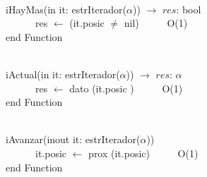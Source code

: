 \documentclass[a4paper,10pt]{article}
\begin{document}
\begin{algoritmo}
\caption{}\\
  iHayMas(in it: estrIterador($\alpha$)) $\rightarrow$ $res$: bool\\
	\indent \ \ \ \ \ \  res $\gets$ (it.posic $\neq$ nil)   \ \ \ \ \ O(1)\\
   end Function 
\end{algoritmo}

\begin{algoritmo}
\caption{}\\
  iActual(in it: estrIterador($\alpha$)) $\rightarrow$ $res$: $\alpha$ \\
	\indent \ \ \ \ \ \  res $\gets$ dato (it.posic )   \ \ \ \ \ O(1)\\
   end Function 
\end{algoritmo}

\begin{algoritmo}
\caption{}\\
  iAvanzar(inout it: estrIterador($\alpha$)) \\
	\indent \ \ \ \ \ \  it.posic $\gets$ prox (it.posic)  \ \ \ \ \ O(1)\\
   end Function 
\end{algoritmo}
\end{document}
